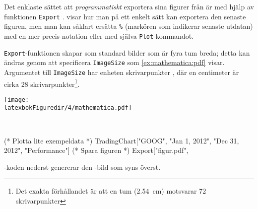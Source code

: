 \documentclass[lang=sv,ptsize=10pt,font=none,nomath,titles=bf,../../a4.tex]{subfiles}
\begin{document}
Det enklaste sättet att \emph{programmatiskt} exportera sina figurer
från \Mathematica är med hjälp av funktionen \texttt{Export}
\parencite{Wolfram13a}.  visar hur man på ett
enkelt sätt kan exportera den senaste figuren, men man kan såklart
ersätta \texttt{\%} (markören som indikerar senaste utdatan) med
en mer precis notation
\parencite[se dokumentationen för \texttt{Out}][]{Wolfram13b}
eller med själva \texttt{Plot}-kommandot.

\texttt{Export}-funktionen skapar som standard bilder som är fyra
tum breda; detta kan ändras genom att specificera \texttt{ImageSize}
som \cref{ex:mathematica:pdf} visar. Argumentet till \texttt{ImageSize}
har enheten skrivarpunkter , där en centimeter
är cirka 28 skrivarpunkter\footnote{Det exakta förhållandet är att en
tum (\SI{2.54}{\centi\metre}) motsvarar 72 skrivarpunkter}.

\begin{kod}[tbp]
	\centering
	\begin{minipage}{\textwidth}
		\centering
		\texttt{[image: \\latexbokFiguredir/4/mathematica.pdf]}
	\end{minipage}
	\\[2ex]
	\begin{minipage}{\textwidth}
		\begin{matlabcode}
(* Plotta lite exempeldata *)
TradingChart[{"GOOG", {"Jan 1, 2012", 
   "Dec 31, 2012"}}, {"Performance"}]
(* Spara figuren *)
Export["figur.pdf", %
		\end{matlabcode}
	\end{minipage}
	\caption{\Mathematica-koden nederst genererar den \PDF-bild som
	syns överst.}
	\label{ex:mathematica:pdf}
\end{kod}


\label{sec:4:end}
\end{document}
